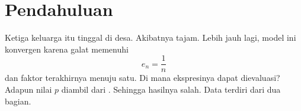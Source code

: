\documentclass{article}
\begin{document}
\section{Pendahuluan}
Ketiga keluarga itu tinggal di desa. Akibatnya tajam. Lebih jauh lagi, model ini konvergen
karena galat memenuhi
\begin{equation}
e_n = \frac{1}{n} \label{eq:1}
\end{equation}
dan faktor terakhirnya menuju satu. Di mana ekspresinya dapat dievaluasi? Adapun nilai $p$ diambil dari \cite{alwi2010}.
Sehingga hasilnya salah. Data terdiri dari dua bagian.
\end{document}

